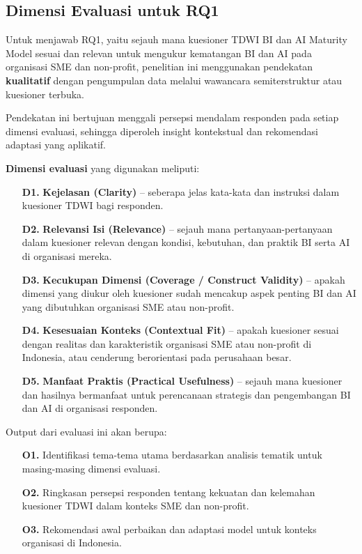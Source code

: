 \documentclass{article}
\begin{document}
\subsection{Dimensi Evaluasi untuk RQ1}
Untuk menjawab RQ1, yaitu sejauh mana kuesioner TDWI BI dan AI Maturity Model sesuai dan relevan untuk mengukur kematangan BI dan AI pada organisasi SME dan non-profit, penelitian ini menggunakan pendekatan \textbf{kualitatif} dengan pengumpulan data melalui wawancara semiterstruktur atau kuesioner terbuka.

Pendekatan ini bertujuan menggali persepsi mendalam responden pada setiap dimensi evaluasi, sehingga diperoleh insight kontekstual dan rekomendasi adaptasi yang aplikatif.

\textbf{Dimensi evaluasi} yang digunakan meliputi:

\begin{enumerate}
	\item[\textbf{D1.}] \textbf{Kejelasan (Clarity)} – seberapa jelas kata-kata dan instruksi dalam kuesioner TDWI bagi responden.
	
	\item[\textbf{D2.}] \textbf{Relevansi Isi (Relevance)} – sejauh mana pertanyaan-pertanyaan dalam kuesioner relevan dengan kondisi, kebutuhan, dan praktik BI serta AI di organisasi mereka.
	
	\item[\textbf{D3.}] \textbf{Kecukupan Dimensi (Coverage / Construct Validity)} – apakah dimensi yang diukur oleh kuesioner sudah mencakup aspek penting BI dan AI yang dibutuhkan organisasi SME atau non-profit.
	
	\item[\textbf{D4.}] \textbf{Kesesuaian Konteks (Contextual Fit)} – apakah kuesioner sesuai dengan realitas dan karakteristik organisasi SME atau non-profit di Indonesia, atau cenderung berorientasi pada perusahaan besar.
	
	\item[\textbf{D5.}] \textbf{Manfaat Praktis (Practical Usefulness)} – sejauh mana kuesioner dan hasilnya bermanfaat untuk perencanaan strategis dan pengembangan BI dan AI di organisasi responden.
\end{enumerate}

Output dari evaluasi ini akan berupa:
\begin{enumerate}
	\item[\textbf{O1.}] Identifikasi tema-tema utama berdasarkan analisis tematik untuk masing-masing dimensi evaluasi.
	\item[\textbf{O2.}] Ringkasan persepsi responden tentang kekuatan dan kelemahan kuesioner TDWI dalam konteks SME dan non-profit.
	\item[\textbf{O3.}] Rekomendasi awal perbaikan dan adaptasi model untuk konteks organisasi di Indonesia.
\end{enumerate}
\end{document}
